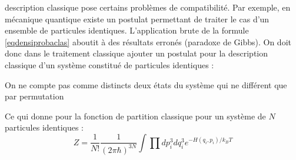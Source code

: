 \documentclass[12pt]{book}
\begin{document}
description classique pose certains probl\`emes de compatibilit\'e. Par
exemple, en m\'ecanique quantique existe un postulat permettant de
traiter le cas d'un ensemble de particules identiques. L'application
brute de la formule \ref{eqdensiprobaclas} aboutit \`a des r\'esultats
erron\'es (paradoxe de Gibbs). On doit donc dans le traitement
classique ajouter un postulat pour la description classique d'un
syst\`eme constitu\'e de particules identiques :
\begin{postulat}
On ne compte pas comme distincts deux \'etats du syst\`eme qui ne
diff\'erent que par permutation
\end{postulat}
Ce qui donne pour la fonction de partition classique pour un syst\`eme
de $N$ particules identiques :
\begin{equation}
Z=\frac{1}{N!}\frac{1}{(2\pi\hbar)^{3N}}\int\prod dp^{3}_i dq^{3}_i
e^{-H(q_i,p_i)/k_BT} 
\end{equation}
\end{document}

